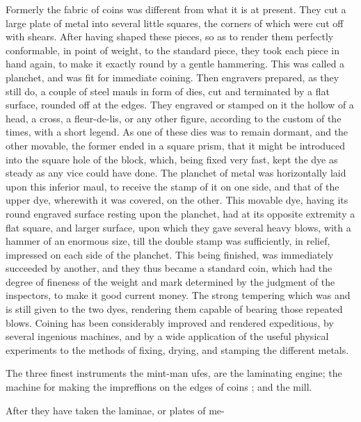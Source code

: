 \documentclass{article}
\begin{document}
Formerly the fabric of coins was different from what it is at present. They cut a large plate of metal into several little squares, the corners of which were cut off with shears. After having shaped these pieces, so as to render them perfectly conformable, in point of weight, to the standard piece, they took each piece in hand again, to make it exactly round by a gentle hammering. This was called a planchet, and was fit for immediate coining. Then engravers prepared, as they still do, a couple of steel mauls in form of dies, cut and terminated by a flat surface, rounded off at the edges. They engraved or stamped on it the hollow of a head, a cross, a fleur-de-lis, or any other figure, according to the custom of the times, with a short legend. As one of these dies was to remain dormant, and the other movable, the former ended in a square prism, that it might be introduced into the square hole of the block, which, being fixed very fast, kept the dye as steady as any vice could have done. The planchet of metal was horizontally laid upon this inferior maul, to receive the stamp of it on one side, and that of the upper dye, wherewith it was covered, on the other. This movable dye, having its round engraved surface resting upon the planchet, had at its opposite extremity a flat square, and larger surface, upon which they gave several heavy blows, with a hammer of an enormous size, till the double stamp was sufficiently, in relief, impressed on each side of the planchet. This being finished, was immediately succeeded by another, and they thus became a standard coin, which had the degree of fineness of the weight and mark determined by the judgment of the inspectors, to make it good current money. The strong tempering which was and is still given to the two dyes, rendering them capable of bearing those repeated blows. Coining has been considerably improved and rendered expeditious, by several ingenious machines, and by a wide application of the useful physical experiments to the methods of fixing, drying, and stamping the different metals.

The three finest instruments the mint-man ufes, are the laminating engine; the machine for making the impreffions on the edges of coins ; and the mill.

After they have taken the laminae, or plates of me-
\end{document}
